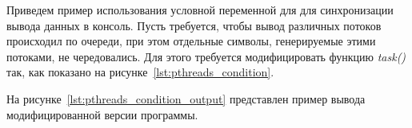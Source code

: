 Приведем пример использования условной переменной для для синхронизации вывода данных в консоль.
Пусть требуется, чтобы вывод различных потоков происходил по очереди,
при этом отдельные символы, генерируемые этими потоками, не чередовались.
Для этого требуется модифицировать функцию \textit{task()} так, как показано на
рисунке~\ref{lst:pthreads_condition}.



На рисунке~\ref{lst:pthreads_condition_output} представлен пример вывода
модифицированной версии программы.


